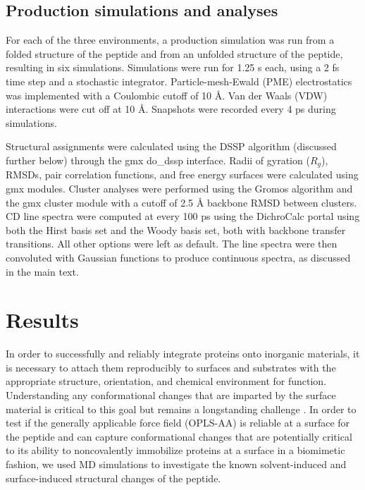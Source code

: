 \subsection{Production simulations and analyses}

For each of the three environments, a production simulation was run from a folded structure of the peptide and from an unfolded structure of the peptide, resulting in six simulations. 
Simulations were run for 1.25 \textmu{}s each, using a 2 fs time step and a stochastic integrator. Particle-mesh-Ewald (PME) electrostatics was implemented with a Coulombic cutoff of 10 \si{\angstrom}. 
Van der Waals (VDW) interactions were cut off at 10 \si{\angstrom}. 
Snapshots were recorded every 4 ps during simulations.

Structural assignments were calculated using the DSSP algorithm (discussed further below)\cite{Kabsch1983, Joosten2011} through the gmx do\_dssp interface. 
Radii of gyration ($R_g$), RMSDs, pair correlation functions, and free energy surfaces were calculated using gmx modules. 
Cluster analyses were performed using the Gromos algorithm\cite{Daura1999} and the gmx cluster module with a cutoff of 2.5 \si{\angstrom} backbone RMSD between clusters. 
CD line spectra were computed at every 100 ps using the DichroCalc portal\cite{Bulheller2009, Jasim2018} using both the Hirst basis set\cite{Hirst1998, Besley1999} and the Woody basis set\cite{Woody1999}, both with backbone transfer transitions. 
All other options were left as default. 
The line spectra were then convoluted with Gaussian functions to produce continuous spectra, as discussed in the main text.

\section{Results}

In order to successfully and reliably integrate proteins onto inorganic materials, it is necessary to attach them reproducibly to surfaces and substrates with the appropriate structure, orientation, and chemical environment for function. 
Understanding any conformational changes that are imparted by the surface material is critical to this goal but remains a longstanding challenge \cite{Hlady1996, Castner2002, Latour2005biomaterials}.
In order to test if the generally applicable force field (OPLS-AA) is reliable at a surface for the \pep{} peptide and can capture conformational changes that are potentially critical to its ability to noncovalently immobilize proteins at a surface in a biomimetic fashion, we used MD simulations to investigate the known solvent-induced and surface-induced structural changes of the peptide.

